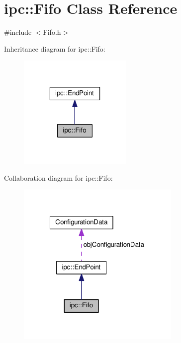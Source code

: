 \hypertarget{classipc_1_1Fifo}{}\section{ipc\+:\+:Fifo Class Reference}
\label{classipc_1_1Fifo}


{\ttfamily \#include $<$Fifo.\+h$>$}



Inheritance diagram for ipc\+:\+:Fifo\+:
\nopagebreak
\begin{figure}[H]
\begin{center}
\leavevmode
\includegraphics[width=154pt]{classipc_1_1Fifo__inherit__graph}
\end{center}
\end{figure}


Collaboration diagram for ipc\+:\+:Fifo\+:
\nopagebreak
\begin{figure}[H]
\begin{center}
\leavevmode
\includegraphics[width=222pt]{classipc_1_1Fifo__coll__graph}
\end{center}
\end{figure}
